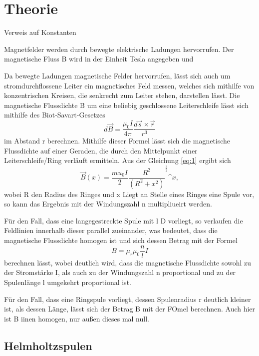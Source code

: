 \section{Theorie}
\label{sec:Theorie}

Verweis auf Konstanten

Magnetfelder werden durch bewegte elektrische Ladungen hervorrufen. Der magnetische Fluss B wird in der Einheit Tesla 
angegeben und 


Da bewegte Ladungen magnetische Felder hervorrufen, lässt sich auch um stromdurchflossene Leiter ein 
magnetisches Feld messen, welches sich mithilfe von konzentrischen Kreisen, die senkrecht zum Leiter 
stehen, darstellen lässt.
Die magnetische Flussdichte B um eine beliebig geschlossene Leiterschleife lässt sich mithilfe des Biot-Savart-Gesetzes
\begin{equation}
    d\vec B = \frac{\mu_0 I}{4 \pi} \frac{d\vec s \times \vec r}{r^3}
    \label{eq:2} 
\end{equation}
\noindent
im Abstand r berechnen. Mithilfe dieser Formel lässt sich die magnetische Flussdichte auf einer Geraden, die durch den 
Mittelpunkt einer Leiterschleife/Ring verläuft ermitteln. Aus der Gleichung \ref{eq:1} ergibt sich 
\begin{equation}
    \vec B (x) = \frac{mu_0 I}{2} \frac{R^2}{(R^2+x^2)}^\frac{3}{2} \^{x},
\end{equation}
\noindent
wobei R den Radius des Ringes und x 
Liegt an Stelle eines Ringes eine Spule vor, so kann das Ergebnis mit der Windungszahl n multipliueirt werden.



Für den Fall, dass eine langegestreckte Spule mit l \gg D vorliegt, so verlaufen die Feldlinien 
innerhalb dieser parallel zueinander, was bedeutet, dass die magnetische Flussdichte homogen 
ist und sich dessen Betrag mit der Formel
\begin{equation}
    B = \mu_r \mu_0 \frac{n}{l} I
    \label{eq:a}
\end{equation}
\noindent 
berechnen lässt, wobei deutlich wird, dass die magnetische Flussdichte sowohl zu der Stromstärke I, 
als auch zu der Windungszahl n proportional und zu der Spulenlänge l umgekehrt proportional ist.

Für den Fall, dass eine Ringspule vorliegt, dessen Spulenradius r deutlich kleiner ist, als dessen Länge, lässt sich
der Betrag B mit der FOmel berechnen. Auch hier ist B iinen homogen, nur außen dieses mal null.

\subsection{Helmholtzspulen}

